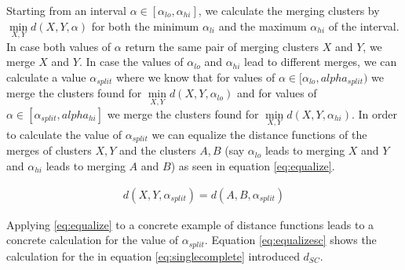 Starting from an interval $\alpha \in [\alpha_{lo}, \alpha_{hi}]$, we calculate the merging clusters by $\min\limits_{X, Y} d(X,Y,\alpha)$ for both the minimum $\alpha_{li}$ and the maximum $\alpha_{hi}$ of the interval. In case both values of $\alpha$ return the same pair of merging clusters $X$ and $Y$, we merge $X$ and $Y$. In case the values of $\alpha_{lo}$ and $\alpha_{hi}$ lead to different merges, we can calculate a value $\alpha_{split}$ where we know that for values of $\alpha \in [\alpha_{lo}, alpha_{split})$ we merge the clusters found for $\min\limits_{X, Y} d(X,Y,\alpha_{lo})$ and for values of $\alpha \in [\alpha_{split}, alpha_{hi}]$ we merge the clusters found for $\min\limits_{X, Y} d(X,Y,\alpha_{hi})$. In order to calculate the value of $\alpha_{split}$ we can equalize the distance functions of the merges of clusters $X, Y$ and the clusters $A, B$ (say $\alpha_{lo}$ leads to merging $X$ and $Y$ and $\alpha_{hi}$ leads to merging $A$ and $B$) as seen in equation \ref{eq:equalize}. 

\begin{equation}
    \begin{aligned}
        d(X,Y,\alpha_{split}) = d(A,B,\alpha_{split})
    \end{aligned}
    \label{eq:equalize}
\end{equation}

Applying \ref{eq:equalize} to a concrete example of distance functions leads to a concrete calculation for the value of $\alpha_{split}$. Equation \ref{eq:equalizesc} shows the calculation for the in equation \ref{eq:singlecomplete} introduced $d_{SC}$.

